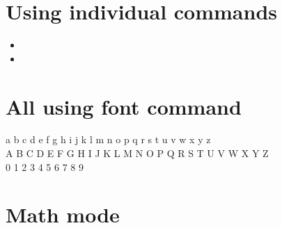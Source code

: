 \documentclass[a4paper,10pt]{article}
\newcommand{\clight}{\fontdot{c}}
\newcommand{\mass}{\fontdot{m}}
\begin{document}
\section{Using individual commands}
\begin{itemize}
    \item \clight
    \item \mass
\end{itemize}

\section{All using font command}
{\fontdot
    a b c d e f g h i j k l m n o p q r s t u v w x y z
\\    A B C D E F G H I J K L M N O P Q R S T U V W X Y Z
\\    0 1 2 3 4 5 6 7 8 9
}

\section{Math mode}
\end{document}
